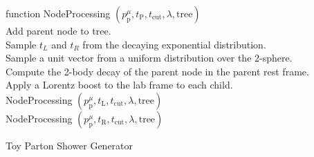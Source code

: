 \documentclass[12pt]{article}
\begin{document}
\begin{algorithm}

    function NodeProcessing $(p^\mu_{\text{p}}, t_\text{P}, t_\text{cut}, \lambda, \text{tree})$\\
    \Indp
    Add parent node to tree. \\
      {
      	Sample $t_L$ and $t_R$ from the decaying exponential distribution.\\
	Sample a unit vector from a uniform distribution over the 2-sphere.\\
	Compute the 2-body decay of the parent node in the parent rest frame.\\
	Apply a Lorentz boost to the lab frame to each child.\\
	NodeProcessing $(p^\mu_{\text{p}}, t_\text{L}, t_\text{cut}, \lambda, \text{tree})$\\
	NodeProcessing $(p^\mu_{\text{p}}, t_\text{R}, t_\text{cut}, \lambda, \text{tree})$\\
      }
    \caption{Toy Parton Shower Generator}
\end{algorithm}
\end{document}
